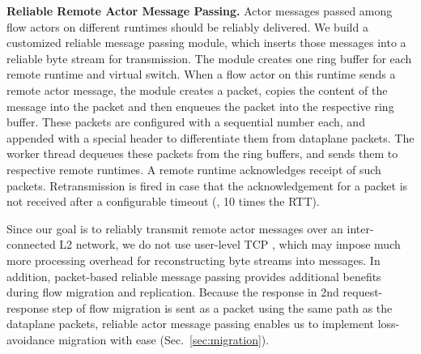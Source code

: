 \vspace{1mm}
\noindent \textbf{Reliable Remote Actor Message Passing.}
Actor messages passed among flow actors on different runtimes should be reliably delivered. We build a customized reliable message passing module, which inserts those messages into a reliable byte stream for transmission. %
The module creates one ring buffer for each remote runtime and virtual switch. When a flow actor on this runtime sends a remote actor message, the module creates a packet, copies the content of the message into the packet and then enqueues the packet into the respective ring buffer. %
These packets are configured with a sequential number each, and appended with a special header to differentiate them from dataplane packets.
The worker thread dequeues these packets from the ring buffers, and sends them to respective remote runtimes. A remote runtime acknowledges receipt of such packets. Retransmission is fired in case that the acknowledgement for a packet is not received after a configurable timeout (\eg, 10 times the RTT).

Since our goal is to reliably transmit remote actor messages over an inter-connected L2 network, we do not use user-level TCP \cite{jeong2014mtcp}, %
which may impose much more processing overhead for reconstructing byte streams into messages.
In addition, packet-based reliable message passing provides additional benefits during flow migration and replication. Because the response in 2nd request-response step of flow migration is sent as a packet using the same path as the dataplane packets, reliable actor message passing enables us to implement loss-avoidance migration with ease (Sec.~\ref{sec:migration}).

